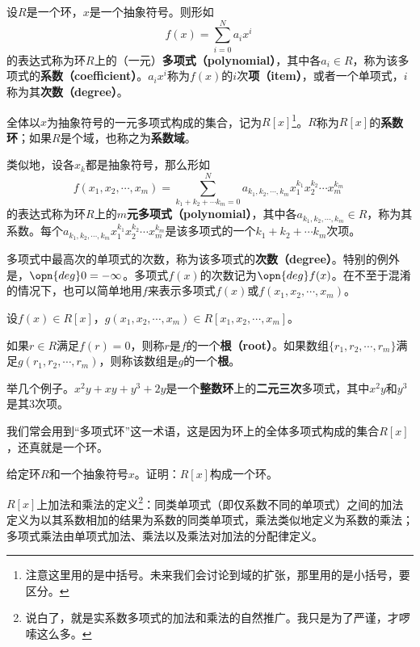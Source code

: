 \begin{definition}{}

设$R$是一个环，$x$是一个抽象符号。则形如
\begin{equation}
    f(x) = \sum_{i=0}^N a_i x^i~
\end{equation}
的表达式称为环$R$上的（一元）\textbf{多项式（polynomial）}，其中各$a_i\in R$，称为该多项式的\textbf{系数（coefficient）}。$a_i x^i$称为$f(x)$的$i$次\textbf{项（item）}，或者一个单项式，$i$称为其\textbf{次数（degree）}。

全体以$x$为抽象符号的一元多项式构成的集合，记为$R[x]$\footnote{注意这里用的是中括号。未来我们会讨论到域的扩张，那里用的是小括号，要区分。}。$R$称为$R[x]$的\textbf{系数环}；如果$R$是个域，也称之为\textbf{系数域}。

类似地，设各$x_k$都是抽象符号，那么形如
\begin{equation}
    f(x_1, x_2, \cdots, x_m) = \sum_{k_1+k_2+\cdots k_m=0}^N a_{k_1, k_2, \cdots, k_m} x_1^{k_1}x_2^{k_2}\cdots x_m^{k_m}~
\end{equation}
的表达式称为环$R$上的\textbf{$m$元多项式（polynomial）}，其中各$a_{k_1, k_2, \cdots, k_m}\in R$，称为其系数。每个$a_{k_1, k_2, \cdots, k_m} x_1^{k_1}x_2^{k_2}\cdots x_m^{k_m}$是该多项式的一个$k_1+k_2+\cdots k_m$次项。

多项式中最高次的单项式的次数，称为该多项式的\textbf{次数（degree）}。特别的例外是，$\opn{deg}0 = -\infty$。多项式$f(x)$的次数记为$\opn{deg} f(x)$。在不至于混淆的情况下，也可以简单地用$f$来表示多项式$f(x)$或$f(x_1, x_2, \cdots, x_m)$。

\end{definition}

\begin{definition}{}

设$f(x)\in R[x]$，$g(x_1, x_2, \cdots, x_m)\in R[x_1, x_2, \cdots, x_m]$。

如果$r\in R$满足$f(r)=0$，则称$r$是$f$的一个\textbf{根（root）}。如果数组$\{r_1, r_2, \cdots, r_m\}$满足$g(r_1, r_2, \cdots, r_m)$，则称该数组是$g$的一个\textbf{根}。

\end{definition}

举几个例子。$x^2y+xy+y^3+2y$是一个\textbf{整数环}上的\textbf{二元三次}多项式，其中$x^2y$和$y^3$是其$3$次项。

我们常会用到“多项式环”这一术语，这是因为环上的全体多项式构成的集合$R[x]$，还真就是一个环。

\begin{exercise}{}
给定环$R$和一个抽象符号$x$。证明：$R[x]$构成一个环。

$R[x]$上加法和乘法的定义\footnote{说白了，就是实系数多项式的加法和乘法的自然推广。我只是为了严谨，才啰嗦这么多。}：同类单项式（即仅系数不同的单项式）之间的加法定义为以其系数相加的结果为系数的同类单项式，乘法类似地定义为系数的乘法；多项式乘法由单项式加法、乘法以及乘法对加法的分配律定义。
\end{exercise}

